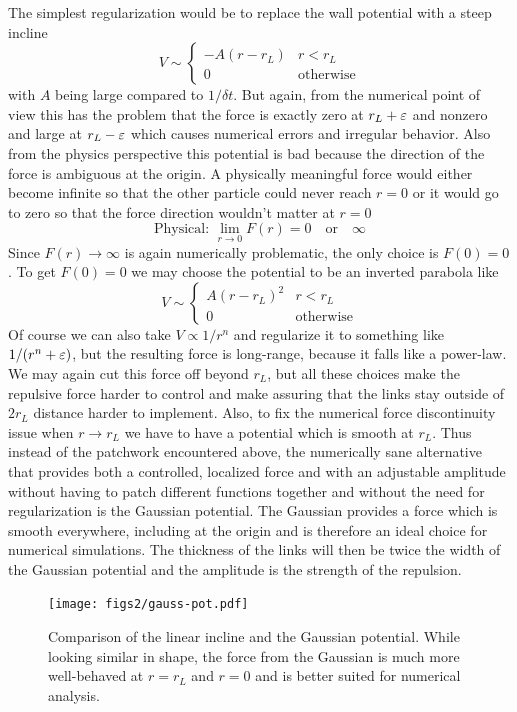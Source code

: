 \documentclass[linenumbers,endfloats,nofootinbib,preprint,floatfix,titlepage,superscriptaddress]{revtex4-1} %
\begin{document}
The simplest regularization would be to replace the wall potential with a steep incline
\[V \sim \begin{cases} -A(r -r_L) & r< r_L \\
0 & \mbox{otherwise} 
\end{cases}\]
with $A$ being large compared to $1/\delta t$. 
But again, from the numerical point of view this has the problem that the force is exactly zero at $r_L+\varepsilon$ and nonzero and large at $r_L - \varepsilon$ which causes numerical errors and irregular behavior. Also from the physics perspective this potential is bad because the direction of the force is ambiguous at the origin. A physically meaningful force would either become infinite so that the other particle could never reach $r=0$ or it would go to zero so that the force direction wouldn't matter at $r=0$
\[\mbox{Physical: } \lim_{r\to 0} F(r) = 0 \quad \mbox{or}\quad \infty \]
Since $F(r)\to \infty$ is again numerically problematic, the only choice is $F(0) = 0$. To get $F(0) = 0$ we may choose the potential to be an inverted parabola like
\[V \sim \begin{cases} A(r -r_L)^2 & r< r_L \\
0 & \mbox{otherwise} 
\end{cases}\]
Of course we can also take $V\propto 1/r^n$ 
and regularize it to something like $1/(r^n+\varepsilon)$, but the resulting force is long-range, because it falls like a power-law. We may again cut this force off beyond $r_L$, but all these choices make the repulsive force harder to control and make assuring that the links stay outside of $2r_L$ distance harder to implement. 
Also, to fix the numerical force discontinuity issue when $r\to r_L$ we have to have a potential which is smooth at $r_L$. Thus instead of the patchwork encountered above, the numerically  sane 
alternative that provides both a controlled, localized force and with an adjustable amplitude without having to patch different functions together and without the need for regularization is the Gaussian potential. 
The Gaussian provides a force which is smooth everywhere, including at the origin and is therefore an ideal choice for numerical simulations. 
The thickness of the links will then be twice the width of the Gaussian potential and the amplitude is the strength of the repulsion.  

\begin{figure}
    \centering
    \texttt{[image: figs2/gauss-pot.pdf]}
    \caption{Comparison of the linear incline and the Gaussian potential. While looking similar in shape, the force from the Gaussian is much more well-behaved at $r= r_L$ and $r=0$ and is better suited for numerical analysis. }
    \label{fig:gauss}
\end{figure}
\end{document}
